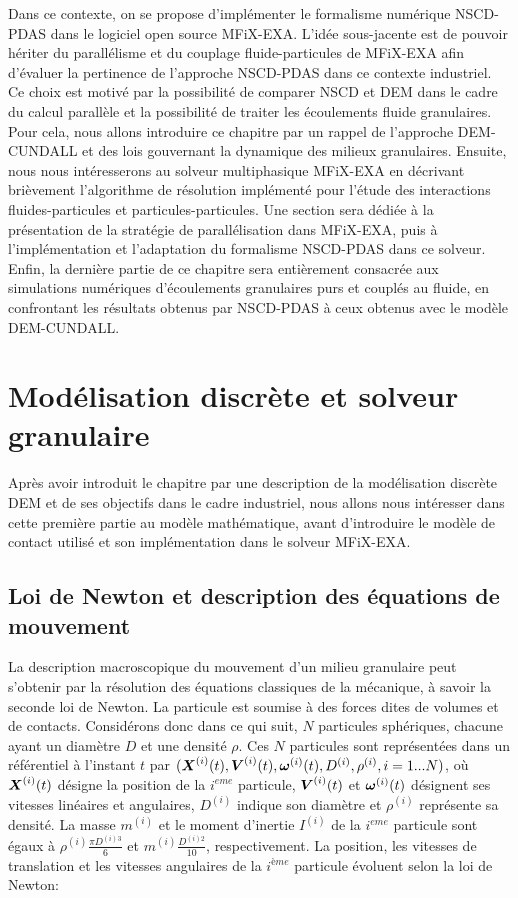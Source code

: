 Dans ce contexte, on se propose d'implémenter le formalisme numérique NSCD-PDAS dans le logiciel open source MFiX-EXA. L'idée sous-jacente est de pouvoir hériter du parallélisme et du couplage fluide-particules de MFiX-EXA afin d'évaluer la pertinence de l'approche NSCD-PDAS dans ce contexte industriel. Ce choix est motivé par la possibilité de comparer NSCD et DEM dans le cadre du calcul parallèle et la possibilité de traiter les écoulements fluide granulaires. Pour cela, nous allons introduire ce chapitre par un rappel de l'approche DEM-CUNDALL et des lois gouvernant la dynamique des milieux granulaires. Ensuite, nous nous intéresserons au solveur multiphasique MFiX-EXA en décrivant brièvement l'algorithme de résolution implémenté pour l'étude des interactions fluides-particules et particules-particules. Une section sera dédiée à la présentation de la stratégie de parallélisation dans MFiX-EXA, puis à l'implémentation et l'adaptation du formalisme NSCD-PDAS dans ce solveur. Enfin, la dernière partie de ce chapitre sera entièrement consacrée aux simulations numériques d'écoulements granulaires purs et couplés au fluide, en confrontant les résultats obtenus par NSCD-PDAS à ceux obtenus avec le modèle DEM-CUNDALL.

\section{Modélisation discrète et solveur granulaire}

Après avoir introduit le chapitre par une description de la modélisation discrète DEM et de ses objectifs dans le cadre industriel, nous allons nous intéresser dans cette première partie au modèle mathématique, avant d'introduire le modèle de contact utilisé et son implémentation dans le solveur MFiX-EXA.

\subsection{Loi de Newton et description des équations de mouvement}

La description macroscopique du mouvement d'un milieu granulaire peut s'obtenir par la résolution des équations classiques de la mécanique, à savoir la seconde loi de Newton. La particule est soumise à des forces dites de volumes et de contacts. Considérons donc dans ce qui suit, $N$ particules sphériques, chacune ayant un diamètre $D$ et une densité $\rho$. Ces $N$ particules sont représentées dans un référentiel à l'instant $t$ par ${(\boldsymbol{X}^{(i)}(t),\boldsymbol{V}^{(i)}(t), \boldsymbol{\omega}^{(i)}(t), D^{(i)}, \rho^{(i)}, i = 1 ... N)}$, où $\boldsymbol{X}^{(i)}(t)$ désigne la position de la $i^{eme}$ particule, $\boldsymbol{V}^{(i)}(t)$ et $\boldsymbol{\omega}^{(i)}(t)$ désignent ses vitesses linéaires et angulaires, $D^{(i)}$ indique son diamètre et $\rho^{(i)}$ représente sa densité. La masse $m^{(i)}$ et le moment d'inertie $I^{(i)}$ de la $i^{eme}$ particule sont égaux à $\rho^{(i)} \frac{\pi D^{(i)3}}{6}$ et $m^{(i)} \frac{D^{(i)2}}{10}$, respectivement. La position, les vitesses de translation et les vitesses angulaires de la $i^{ème}$ particule évoluent selon la loi de Newton:

